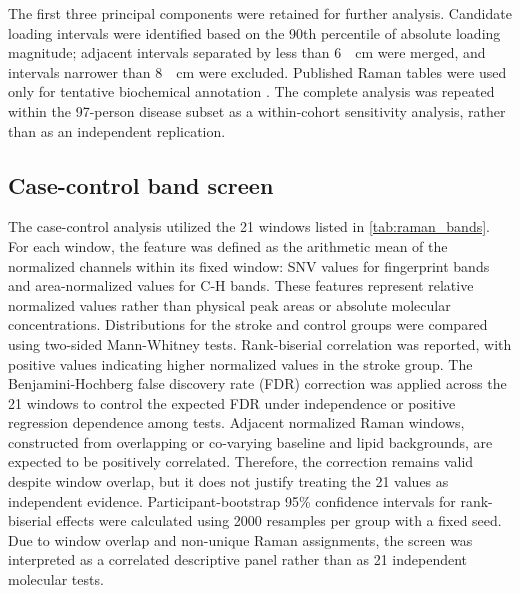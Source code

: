 \documentclass[preprint,12pt]{elsarticle}
\begin{document}
The first three principal components were retained for further analysis. Candidate loading intervals were identified based on the 90th percentile of absolute loading magnitude; adjacent intervals separated by less than 6~\si{\per\centi\metre} were merged, and intervals narrower than 8~\si{\per\centi\metre} were excluded. Published Raman tables were used only for tentative biochemical annotation \cite{kaminska2022,imanbekova2021,czamara2015}. The complete analysis was repeated within the 97-person disease subset as a within-cohort sensitivity analysis, rather than as an independent replication.

\subsection{Case-control band screen} 
\label{subsec:band_analysis}

The case-control analysis utilized the 21 windows listed in \cref{tab:raman_bands}. For each window, the feature was defined as the arithmetic mean of the normalized channels within its fixed window: SNV values for fingerprint bands and area-normalized values for C-H bands. These features represent relative normalized values rather than physical peak areas or absolute molecular concentrations. Distributions for the stroke and control groups were compared using two-sided Mann-Whitney tests. Rank-biserial correlation was reported, with positive values indicating higher normalized values in the stroke group. The Benjamini-Hochberg false discovery rate (FDR) correction was applied across the 21 windows to control the expected FDR under independence or positive regression dependence among tests. Adjacent normalized Raman windows, constructed from overlapping or co-varying baseline and lipid backgrounds, are expected to be positively correlated. Therefore, the correction remains valid despite window overlap, but it does not justify treating the 21 values as independent evidence. Participant-bootstrap 95\% confidence intervals for rank-biserial effects were calculated using 2000 resamples per group with a fixed seed. Due to window overlap and non-unique Raman assignments, the screen was interpreted as a correlated descriptive panel rather than as 21 independent molecular tests.
\end{document}
